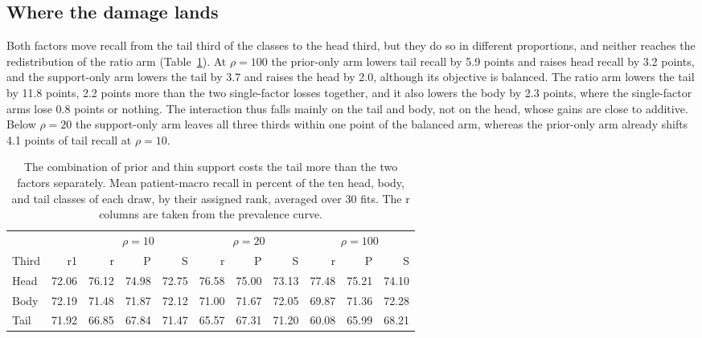 \subsection{Where the damage lands}
\label{sec:rank-results}
Both factors move recall from the tail third of the classes to the head third, but they do so in different proportions, and neither reaches the redistribution of the ratio arm (Table~\ref{tab:thirds}). At $\rho=100$ the prior-only arm lowers tail recall by 5.9 points and raises head recall by 3.2 points, and the support-only arm lowers the tail by 3.7 and raises the head by 2.0, although its objective is balanced. The ratio arm lowers the tail by 11.8 points, 2.2 points more than the two single-factor losses together, and it also lowers the body by 2.3 points, where the single-factor arms lose 0.8 points or nothing. The interaction thus falls mainly on the tail and body, not on the head, whose gains are close to additive. Below $\rho=20$ the support-only arm leaves all three thirds within one point of the balanced arm, whereas the prior-only arm already shifts 4.1 points of tail recall at $\rho=10$.

\begin{table}[htbp]
\centering
\small
\renewcommand{\arraystretch}{1.15}
\begin{tabular}{@{}lrrrrrrrrrr@{}}
\toprule
 & & \multicolumn{3}{c}{$\rho=10$} & \multicolumn{3}{c}{$\rho=20$} & \multicolumn{3}{c}{$\rho=100$} \\
\cmidrule(lr){3-5}\cmidrule(lr){6-8}\cmidrule(lr){9-11}
Third & r1 & r & P & S & r & P & S & r & P & S \\
\midrule
Head & 72.06 & 76.12 & 74.98 & 72.75 & 76.58 & 75.00 & 73.13 & 77.48 & 75.21 & 74.10 \\
Body & 72.19 & 71.48 & 71.87 & 72.12 & 71.00 & 71.67 & 72.05 & 69.87 & 71.36 & 72.28 \\
Tail & 71.92 & 66.85 & 67.84 & 71.47 & 65.57 & 67.31 & 71.20 & 60.08 & 65.99 & 68.21 \\
\bottomrule
\end{tabular}
\caption{The combination of prior and thin support costs the tail more than the two factors separately. Mean patient-macro recall in percent of the ten head, body, and tail classes of each draw, by their assigned rank, averaged over 30 fits. The r columns are taken from the prevalence curve.}
\label{tab:thirds}
\end{table}

